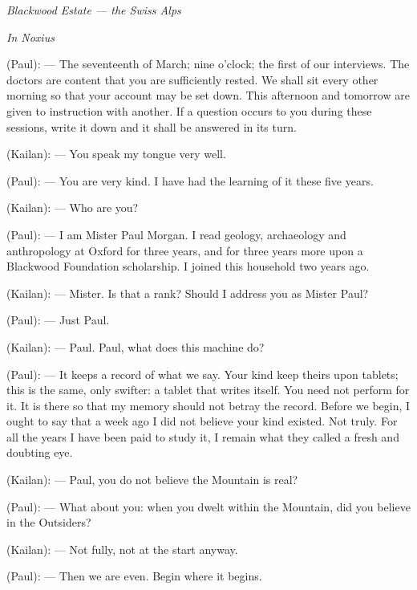 
\begin{center}\small\itshape Blackwood Estate --- the Swiss Alps\end{center}

\begin{room}

\textit{In Noxius}

(Paul): --- The seventeenth of March; nine o'clock; the first of our interviews. The doctors are content that you are sufficiently rested. We shall sit every other morning so that your account may be set down. This afternoon and tomorrow are given to instruction with another. If a question occurs to you during these sessions, write it down and it shall be answered in its turn.\par

(Kailan): --- You speak my tongue very well.\par

(Paul): --- You are very kind. I have had the learning of it these five years.\par

(Kailan): --- Who are you?\par

(Paul): --- I am Mister Paul Morgan. I read geology, archaeology and anthropology at Oxford for three years, and for three years more upon a Blackwood Foundation scholarship. I joined this household two years ago.\par

(Kailan): --- Mister. Is that a rank? Should I address you as Mister Paul?\par

(Paul): --- Just Paul.\par

(Kailan): --- Paul. Paul, what does this machine do?\par

(Paul): --- It keeps a record of what we say. Your kind keep theirs upon tablets; this is the same, only swifter: a tablet that writes itself. You need not perform for it. It is there so that my memory should not betray the record. Before we begin, I ought to say that a week ago I did not believe your kind existed. Not truly. For all the years I have been paid to study it, I remain what they called a fresh and doubting eye.\par

(Kailan): --- Paul, you do not believe the Mountain is real?\par

(Paul): --- What about you: when you dwelt within the Mountain, did you believe in the Outsiders?\par

(Kailan): --- Not fully, not at the start anyway.\par

(Paul): --- Then we are even. Begin where it begins.\par

\end{room}

